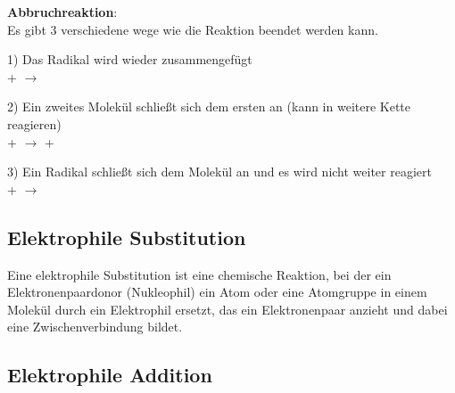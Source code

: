 \vspace{0.5cm}

\textbf{Abbruchreaktion}: \\
Es gibt 3 verschiedene wege wie die Reaktion beendet werden kann.

1) Das Radikal wird wieder zusammengefügt \\
\hspace{0.3cm}
+
\hspace{0.3cm}
\hspace{0.3cm}
$\longrightarrow$
\hspace{0.3cm}

2) Ein zweites Molekül schließt sich dem ersten an (kann in weitere Kette reagieren) \\
\hspace{0.3cm}
+
\hspace{0.3cm}
\hspace{0.3cm}
$\longrightarrow$
\hspace{0.3cm}
\hspace{0.3cm}
+
\hspace{0.3cm}

3) Ein Radikal schließt sich dem Molekül an und es wird nicht weiter reagiert \\
\hspace{0.3cm}
+
\hspace{0.3cm}
\hspace{0.3cm}
$\longrightarrow$
\hspace{0.3cm}


\subsection{Elektrophile Substitution}
Eine elektrophile Substitution ist eine chemische Reaktion, bei der ein Elektronenpaardonor (Nukleophil) ein Atom oder eine Atomgruppe in einem Molekül durch ein Elektrophil ersetzt, das ein Elektronenpaar anzieht und dabei eine Zwischenverbindung bildet.



\subsection{Elektrophile Addition}

